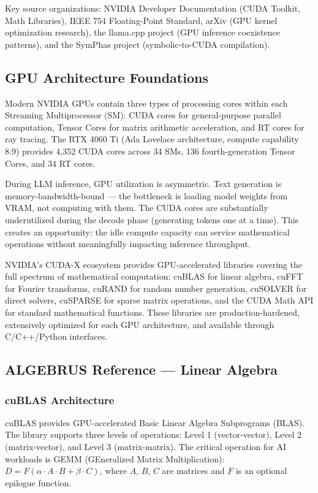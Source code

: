 \documentclass[11pt,letterpaper]{article}
\begin{document}
Key source organizations: NVIDIA Developer Documentation (CUDA Toolkit, Math Libraries), IEEE 754 Floating-Point Standard, arXiv (GPU kernel optimization research), the llama.cpp project (GPU inference coexistence patterns), and the SymPhas project (symbolic-to-CUDA compilation).

\subsection{GPU Architecture Foundations}

Modern NVIDIA GPUs contain three types of processing cores within each Streaming Multiprocessor (SM): CUDA cores for general-purpose parallel computation, Tensor Cores for matrix arithmetic acceleration, and RT cores for ray tracing. The RTX 4060 Ti (Ada Lovelace architecture, compute capability 8.9) provides 4,352 CUDA cores across 34 SMs, 136 fourth-generation Tensor Cores, and 34 RT cores.

During LLM inference, GPU utilization is asymmetric. Text generation is memory-bandwidth-bound --- the bottleneck is loading model weights from VRAM, not computing with them. The CUDA cores are substantially underutilized during the decode phase (generating tokens one at a time). This creates an opportunity: the idle compute capacity can service mathematical operations without meaningfully impacting inference throughput.

NVIDIA's CUDA-X ecosystem provides GPU-accelerated libraries covering the full spectrum of mathematical computation: cuBLAS for linear algebra, cuFFT for Fourier transforms, cuRAND for random number generation, cuSOLVER for direct solvers, cuSPARSE for sparse matrix operations, and the CUDA Math API for standard mathematical functions. These libraries are production-hardened, extensively optimized for each GPU architecture, and available through C/C++/Python interfaces.

\subsection{ALGEBRUS Reference --- Linear Algebra}

\subsubsection{cuBLAS Architecture}

cuBLAS provides GPU-accelerated Basic Linear Algebra Subprograms (BLAS). The library supports three levels of operations: Level 1 (vector-vector), Level 2 (matrix-vector), and Level 3 (matrix-matrix). The critical operation for AI workloads is GEMM (GEneralized Matrix Multiplication): $D = F(\alpha \cdot A \cdot B + \beta \cdot C)$, where $A$, $B$, $C$ are matrices and $F$ is an optional epilogue function.
\end{document}

